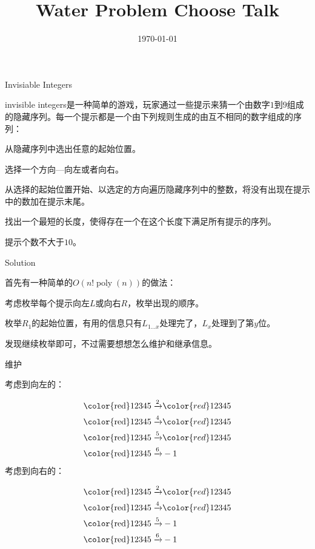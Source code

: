 \documentclass[10pt]{beamer}
\begin{document}
	\title{Water Problem Choose Talk}
	\date{\today}
	\maketitle
	\clearpage
	\begin{frame}{Invisiable Integers}

		invisible integers是一种简单的游戏，玩家通过一些提示来猜一个由数字$1$到$9$组成的隐藏序列。每一个提示都是一个由下列规则生成的由互不相同的数字组成的序列：

		从隐藏序列中选出任意的起始位置。

		选择一个方向---向左或者向右。

		从选择的起始位置开始、以选定的方向遍历隐藏序列中的整数，将没有出现在提示中的数加在提示末尾。

		找出一个最短的长度，使得存在一个在这个长度下满足所有提示的序列。

		提示个数不大于$10$。
	\end{frame}
	\clearpage
	\begin{frame}{Solution}
	
		 首先有一种简单的$O(n!\operatorname{poly}(n))$的做法：

		 考虑枚举每个提示向左$L$或向右$R$，枚举出现的顺序。

		 枚举$R_1$的起始位置，有用的信息只有$L_{1\dots x}$处理完了，$L_x$处理到了第$y$位。

		 发现继续枚举即可，不过需要想想怎么维护和继承信息。
	\end{frame}
	\clearpage
	\begin{frame}{维护}

		 考虑到向左的：
	
		$$
		\begin{aligned}
		\rm{\color{red}123}45\xrightarrow{2}&{\color{red}12}345\\
		\rm{\color{red}123}45\xrightarrow{4}&{\color{red}1234}5\\
		\rm{\color{red}123}45\xrightarrow{5}&{\color{red}123}45\\
		\rm{\color{red}123}45\xrightarrow{6}&-1\\
		\end{aligned}
		$$
		\onslide<2-> 考虑到向右的：
	
		$$
		\begin{aligned}
		\rm{\color{red}123}45\xrightarrow{2}&{\color{red}123}45\\
		\rm{\color{red}123}45\xrightarrow{4}&{\color{red}1234}5\\
		\rm{\color{red}123}45\xrightarrow{5}&-1\\
		\rm{\color{red}123}45\xrightarrow{6}&-1\\
		\end{aligned}
		$$
	
	\end{frame}
\end{document}
